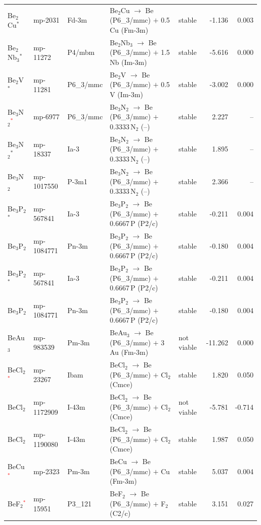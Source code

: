 \begin{longtable}{@{}ll l@{\hspace{4pt}} p{4.6cm} l@{\hspace{4pt}} rr@{}}
Be$_{2}$Cu$^*$ & mp-2031 & Fd-3m & Be$_{2}$Cu $\to$ Be (P6\_3/mmc) $+$ 0.5\,Cu (Fm-3m) & stable & -1.136 & 0.003 \\
Be$_{2}$Nb$_{3}$$^*$ & mp-11272 & P4/mbm & Be$_{2}$Nb$_{3}$ $\to$ Be (P6\_3/mmc) $+$ 1.5\,Nb (Im-3m) & stable & -5.616 & 0.000 \\
Be$_{2}$V$^*$ & mp-11281 & P6\_3/mmc & Be$_{2}$V $\to$ Be (P6\_3/mmc) $+$ 0.5\,V (Im-3m) & stable & -3.002 & 0.000 \\
Be$_{3}$N$_{2}$\textcolor{red}{$^*$} & mp-6977 & P6\_3/mmc & Be$_{3}$N$_{2}$ $\to$ Be (P6\_3/mmc) $+$ 0.3333\,N$_{2}$ (--) & stable & 2.227 & -- \\
Be$_{3}$N$_{2}$$^*$ & mp-18337 & Ia-3 & Be$_{3}$N$_{2}$ $\to$ Be (P6\_3/mmc) $+$ 0.3333\,N$_{2}$ (--) & stable & 1.895 & -- \\
Be$_{3}$N$_{2}$ & mp-1017550 & P-3m1 & Be$_{3}$N$_{2}$ $\to$ Be (P6\_3/mmc) $+$ 0.3333\,N$_{2}$ (--) & stable & 2.366 & -- \\
Be$_{3}$P$_{2}$$^*$ & mp-567841 & Ia-3 & Be$_{3}$P$_{2}$ $\to$ Be (P6\_3/mmc) $+$ 0.6667\,P (P2/c) & stable & -0.211 & 0.004 \\
Be$_{3}$P$_{2}$ & mp-1084771 & Pn-3m & Be$_{3}$P$_{2}$ $\to$ Be (P6\_3/mmc) $+$ 0.6667\,P (P2/c) & stable & -0.180 & 0.004 \\
Be$_{3}$P$_{2}$$^*$ & mp-567841 & Ia-3 & Be$_{3}$P$_{2}$ $\to$ Be (P6\_3/mmc) $+$ 0.6667\,P (P2/c) & stable & -0.211 & 0.004 \\
Be$_{3}$P$_{2}$ & mp-1084771 & Pn-3m & Be$_{3}$P$_{2}$ $\to$ Be (P6\_3/mmc) $+$ 0.6667\,P (P2/c) & stable & -0.180 & 0.004 \\
BeAu$_{3}$ & mp-983539 & Pm-3m & BeAu$_{3}$ $\to$ Be (P6\_3/mmc) $+$ 3\,Au (Fm-3m) & not viable & -11.262 & 0.000 \\
BeCl$_{2}$\textcolor{red}{$^*$} & mp-23267 & Ibam & BeCl$_{2}$ $\to$ Be (P6\_3/mmc) $+$ Cl$_{2}$ (Cmce) & stable & 1.820 & 0.050 \\
BeCl$_{2}$ & mp-1172909 & I-43m & BeCl$_{2}$ $\to$ Be (P6\_3/mmc) $+$ Cl$_{2}$ (Cmce) & not viable & -5.781 & -0.714 \\
BeCl$_{2}$ & mp-1190080 & I-43m & BeCl$_{2}$ $\to$ Be (P6\_3/mmc) $+$ Cl$_{2}$ (Cmce) & stable & 1.987 & 0.050 \\
BeCu\textcolor{red}{$^*$} & mp-2323 & Pm-3m & BeCu $\to$ Be (P6\_3/mmc) $+$ Cu (Fm-3m) & stable & 5.037 & 0.004 \\
BeF$_{2}$\textcolor{red}{$^*$} & mp-15951 & P3\_121 & BeF$_{2}$ $\to$ Be (P6\_3/mmc) $+$ F$_{2}$ (C2/c) & stable & 3.151 & 0.027 \\

\end{longtable}
